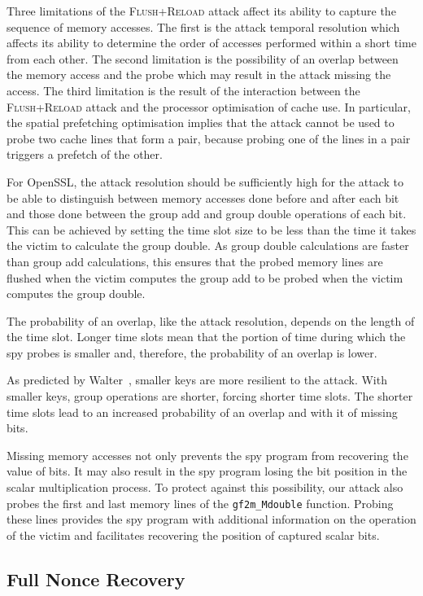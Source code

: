 \documentclass[twocolumn]{article}
\newcommand{\fl}{\textsc{Flu\-sh+\allowbreak Re\-load}\xspace}
\begin{document}
Three limitations of the \fl attack affect its ability to capture the sequence of memory accesses.
The first is the attack temporal resolution which affects its ability to 
determine the order of accesses performed within a short time from each other.
The second limitation is the possibility of an overlap between the memory access and the probe which may result
in the attack missing the access.
The third limitation is the result of the interaction between the \fl attack and the processor
optimisation of cache use.  
In particular, the spatial prefetching optimisation implies that the attack cannot be used to probe two cache lines that form a pair,
because probing one of the lines in a pair triggers a prefetch of the other.



For OpenSSL, the attack resolution should be sufficiently high for the attack to be able to distinguish between 
memory accesses done before and after each bit and those done between the group add and group double operations of each bit.
This can be achieved by setting the time slot size to be less than the time it takes the victim to calculate the group double.
As group double calculations are faster than group add calculations, this ensures that the probed memory lines are flushed
when the victim computes the group add to be probed when the victim computes the group double.

The probability of an overlap, like the attack resolution, depends on the length of the time slot.
Longer time slots mean that the portion of time during which the spy probes is smaller and, therefore, 
the probability of an overlap is lower.

As predicted by Walter~\cite{walter04longer}, smaller keys are more resilient to the attack.
With smaller keys, group operations are shorter, forcing shorter time slots.
The shorter time slots lead to an increased probability of an overlap and with it of missing bits.

Missing memory accesses not only prevents the spy program from recovering the value of bits.
It may also result in the spy program losing the bit position in the scalar multiplication process.
To protect against this possibility, our attack also probes the first and last memory lines of the 
\texttt{gf2m\_Mdouble} function.
Probing these lines provides the spy program with additional information on the operation of the victim
and facilitates recovering the position of captured scalar bits.


\subsection{Full Nonce Recovery}\label{sub:full_nonce}
\end{document}
